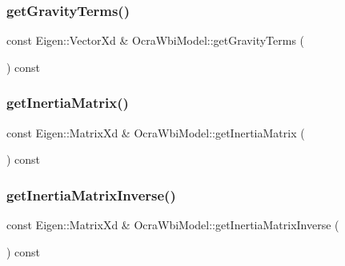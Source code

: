\hypertarget{classocra__icub_1_1OcraWbiModel_a3457af2956db10e303a65886c62c076d}{}\label{classocra__icub_1_1OcraWbiModel_a3457af2956db10e303a65886c62c076d} 
\subsubsection{\texorpdfstring{get\+Gravity\+Terms()}{getGravityTerms()}}
{\footnotesize\ttfamily const Eigen\+::\+Vector\+Xd \& Ocra\+Wbi\+Model\+::get\+Gravity\+Terms (\begin{DoxyParamCaption}{ }\end{DoxyParamCaption}) const\hspace{0.3cm}{\ttfamily [virtual]}}

\hypertarget{classocra__icub_1_1OcraWbiModel_a019c1b4e52bad759d31d9ac60a268ab2}{}\label{classocra__icub_1_1OcraWbiModel_a019c1b4e52bad759d31d9ac60a268ab2} 
\subsubsection{\texorpdfstring{get\+Inertia\+Matrix()}{getInertiaMatrix()}}
{\footnotesize\ttfamily const Eigen\+::\+Matrix\+Xd \& Ocra\+Wbi\+Model\+::get\+Inertia\+Matrix (\begin{DoxyParamCaption}{ }\end{DoxyParamCaption}) const\hspace{0.3cm}{\ttfamily [virtual]}}

\hypertarget{classocra__icub_1_1OcraWbiModel_abba2c3248a9e526e98aa54935c75e84e}{}\label{classocra__icub_1_1OcraWbiModel_abba2c3248a9e526e98aa54935c75e84e} 
\subsubsection{\texorpdfstring{get\+Inertia\+Matrix\+Inverse()}{getInertiaMatrixInverse()}}
{\footnotesize\ttfamily const Eigen\+::\+Matrix\+Xd \& Ocra\+Wbi\+Model\+::get\+Inertia\+Matrix\+Inverse (\begin{DoxyParamCaption}{ }\end{DoxyParamCaption}) const\hspace{0.3cm}{\ttfamily [virtual]}}


